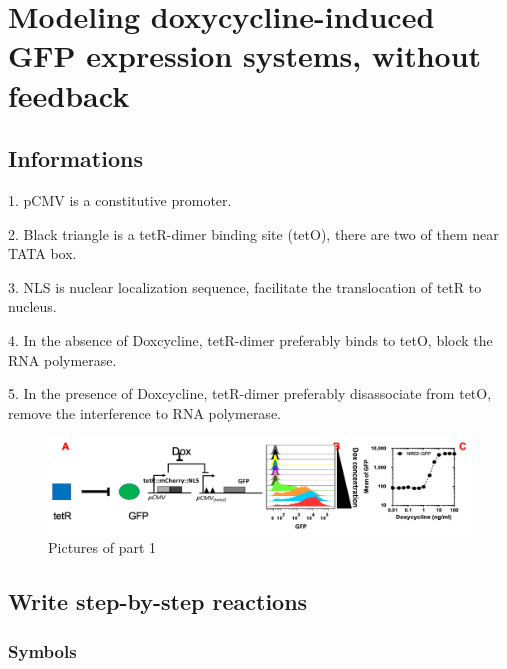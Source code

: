 \chapter{Modeling doxycycline-induced GFP expression systems, without feedback} %

\label{Part1_chapter} %


\section{Informations}

1. pCMV is a constitutive promoter.

2. Black triangle is a tetR-dimer binding site (tetO), there are two of them near TATA box.

3. NLS is nuclear localization sequence, facilitate the translocation of tetR to nucleus.

4. In the absence of Doxcycline, tetR-dimer preferably binds to tetO, block the RNA polymerase.

5. In the presence of Doxcycline, tetR-dimer preferably disassociate from tetO, remove the interference to RNA polymerase.
\\

\begin{figure}[H]
\centering
\includegraphics[width=1.0\linewidth]{Figures/part1.png}
\caption{Pictures of part 1}
\label{part_1_qestion_figure}
\end{figure}

\section{Write step-by-step reactions}



\subsection{Symbols}

